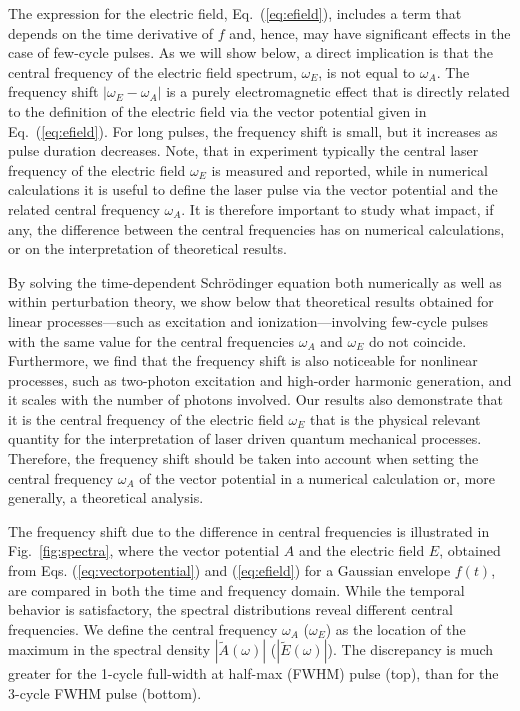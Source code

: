 The expression for the electric field, Eq.~(\ref{eq:efield}), includes a term that depends on the time derivative of $f$ and, hence, may have significant effects in the case of few-cycle pulses. As we will show below, a direct implication is that the central frequency of the electric field spectrum, $\omega_E$, is not equal to $\omega_A$. The frequency shift $|\omega_E - \omega_A|$ is a purely electromagnetic effect that is directly related to the definition of the electric field via the vector potential given in Eq.\ (\ref{eq:efield}). For long pulses, the frequency shift is small, but it increases as pulse duration decreases. Note, that in experiment typically the central laser frequency of the electric field $\omega_E$ is measured and reported, while in numerical calculations it is useful to define the laser pulse via the vector potential and the related central frequency $\omega_A$. It is therefore important to study what impact, if any, the difference between the central frequencies has on numerical calculations, or on the interpretation of theoretical results. 

By solving the time-dependent Schr\"odinger equation both numerically as well as within perturbation theory,
we show below that theoretical results obtained for linear processes---such as excitation and ionization---involving few-cycle pulses with the same value for the central frequencies $\omega_A$ and $\omega_E$ do not coincide. Furthermore, we find that the frequency shift is also noticeable for nonlinear processes, such as two-photon excitation and high-order harmonic generation, and it scales with the number of photons involved. Our results also demonstrate that it is the central frequency of the electric field $\omega_E$ that is the physical relevant quantity for the interpretation of laser driven quantum mechanical processes. Therefore, the frequency shift should be taken into account when setting the central frequency $\omega_A$ of the vector potential in a numerical calculation or, more generally, a theoretical analysis.


The frequency shift due to the difference in central frequencies is illustrated in Fig.~\ref{fig:spectra}, where the vector potential $A$ and the electric field $E$, obtained from Eqs. (\ref{eq:vectorpotential}) and (\ref{eq:efield}) for a Gaussian envelope $f(t)$, are compared in both the time and frequency domain. While the temporal behavior is satisfactory, the spectral distributions reveal different central frequencies. We define the central frequency $\omega_A$ ($\omega_E$) as the location of the maximum in the spectral density $|\tilde{A}(\omega)|$ ($|\tilde{E}(\omega)|$). The discrepancy is much greater for the 1-cycle full-width at half-max (FWHM) pulse (top), than for the 3-cycle FWHM pulse (bottom).

